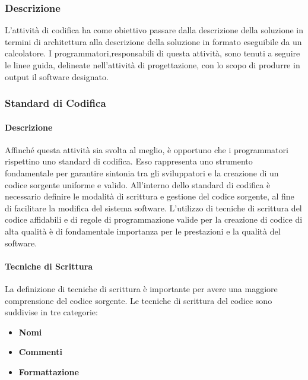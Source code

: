 \subsubsection{Descrizione}
L'attività di codifica ha come obiettivo passare dalla descrizione della soluzione in termini di architettura alla descrizione della soluzione in formato eseguibile da un calcolatore. I programmatori,responsabili di questa attività, sono tenuti a seguire le linee guida, delineate nell'attività di progettazione, con lo scopo di produrre in output il software designato. 

\subsubsection{Standard di Codifica}
\paragraph{Descrizione}
Affinché questa attività sia svolta al meglio, è opportuno che i programmatori rispettino uno standard di codifica.
Esso rappresenta uno strumento fondamentale per garantire sintonia tra gli sviluppatori e la creazione di un codice sorgente uniforme e valido.
All'interno dello standard di codifica è necessario definire le modalità di scrittura e gestione del codice sorgente, al fine di facilitare la modifica del sistema software.
L'utilizzo di tecniche di scrittura del codice affidabili e di regole di programmazione valide per la creazione di codice di alta qualità è di fondamentale importanza per le prestazioni e la qualità del software. 


\paragraph{Tecniche di Scrittura}
La definizione di tecniche di scrittura è importante per avere una maggiore comprensione del codice sorgente.
Le tecniche di scrittura del codice sono suddivise in tre categorie:
\begin{itemize} 
\item
\textbf{Nomi}
\item
\textbf{Commenti}
\item
\textbf{Formattazione}
\end{itemize}


